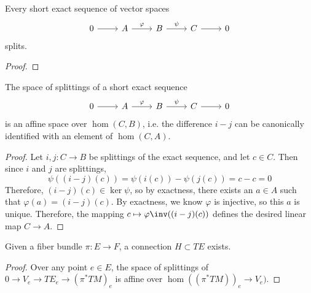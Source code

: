 %
\begin{lem}
Every short exact sequence of vector spaces
\[\begin{tikzcd}
0 \ar[r] & A \ar[r, "\varphi"] & B \ar[r, "\psi"] & C \ar[r] & 0
\end{tikzcd}\]
splits.
\end{lem}
%
\begin{proof} %

\end{proof}
%
\begin{lem}
The space of splittings of a short exact sequence
\[\begin{tikzcd}
0 \ar[r] & A \ar[r, "\varphi"] & B \ar[r, "\psi"] & C \ar[r] & 0
\end{tikzcd}\]
is an affine space over $\hom(C,B)$,
i.e. the difference $i - j$ can be canonically identified with an element of
$\hom(C,A)$.
\end{lem}
%
\begin{proof}
Let $i,j : C \to B$ be splittings of the exact sequence, and let
$c \in C$. Then since $i$ and $j$ are splittings,
\[
\psi((i-j)(c)) = \psi(i(c)) - \psi(j(c)) = c - c = 0
\]
Therefore, $(i-j)(c) \in \ker\psi$, so by exactness, there exists an $a \in A$
such that $\varphi(a) = (i-j)(c)$. By exactness, we know $\varphi$ is injective,
so this $a$ is unique. Therefore, the mapping $c \mapsto \varphi\inv((i-j)(c))$
defines the desired linear map $C \to A$.
\end{proof}
%
\begin{prop}
Given a fiber bundle $\pi : E \to F$, a connection $H \subset TE$ exists.
\end{prop}
%
\begin{proof}%
Over any point $e \in E$, the space of splittings of
$0 \to V_e \to TE_e \to (\pi^*TM)_e$ is affine over $\hom((\pi^*TM))_e \to V_e)$.
\end{proof}
%
